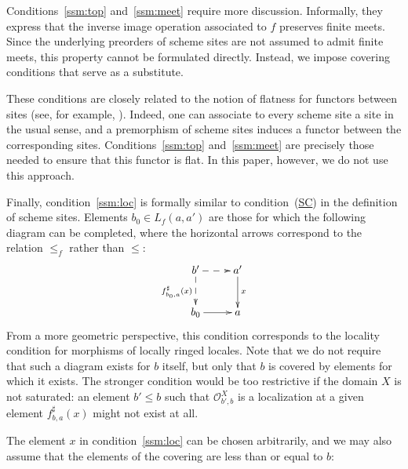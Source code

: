 \documentclass[reqno]{amsart}
\newcommand{\axref}[1]{(\hyperref[ax:#1]{#1})}
\theoremstyle{definition}
\theoremstyle{remark}
\numberwithin{figure}{section}
\begin{document}
Conditions~\eqref{ssm:top} and~\eqref{ssm:meet} require more discussion.
Informally, they express that the inverse image operation associated to $f$ preserves finite meets.
Since the underlying preorders of scheme sites are not assumed to admit finite meets, this property cannot be formulated directly.
Instead, we impose covering conditions that serve as a substitute.

These conditions are closely related to the notion of flatness for functors between sites (see, for example, \cite[Definition~4.1]{shulman-flat}).
Indeed, one can associate to every scheme site a site in the usual sense, and a premorphism of scheme sites induces a functor between the corresponding sites.
Conditions~\eqref{ssm:top} and~\eqref{ssm:meet} are precisely those needed to ensure that this functor is flat.
In this paper, however, we do not use this approach.

Finally, condition~\eqref{ssm:loc} is formally similar to condition~\axref{SC} in the definition of scheme sites.
Elements $b_0 \in L_f(a,a')$ are those for which the following diagram can be completed, where the horizontal arrows correspond to the relation $\leq_f$ rather than $\leq$:
\[ \xymatrix{ b' \ar@{-->}[r] \ar@{-->}[d]_{f^\sharp_{b_0,a}(x)} & a' \ar[d]^x \\
              b_0 \ar[r]                                       & a
            } \]
From a more geometric perspective, this condition corresponds to the locality condition for morphisms of locally ringed locales.
Note that we do not require that such a diagram exists for $b$ itself, but only that $b$ is covered by elements for which it exists.
The stronger condition would be too restrictive if the domain $X$ is not saturated:
an element $b' \leq b$ such that $\mathcal{O}^X_{b',b}$ is a localization at a given element $f^\sharp_{b,a}(x)$ might not exist at all.

The element $x$ in condition~\eqref{ssm:loc} can be chosen arbitrarily, and we may also assume that the elements of the covering are less than or equal to $b$:
\end{document}
